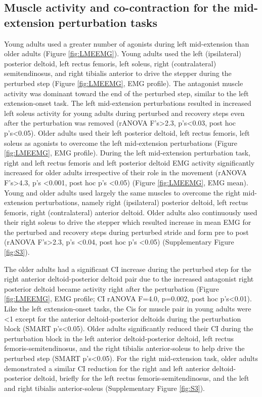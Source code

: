 \documentclass[../thesis_seyed.tex]{subfiles}
\begin{document}
\subsection{Muscle activity and co-contraction for the mid-extension perturbation tasks}
Young adults used a greater number of agonists during left mid-extension than older adults (Figure \ref{fig:LMEEMG}). Young adults used the left (ipsilateral) posterior deltoid, left rectus femoris, left soleus, right (contralateral) semitendinosus, and right tibialis anterior to drive the stepper during the perturbed step (Figure \ref{fig:LMEEMG}, EMG profile). The antagonist muscle activity was dominant toward the end of the perturbed step, similar to the left extension-onset task. The left mid-extension perturbations resulted in increased left soleus activity for young adults during perturbed and recovery steps even after the perturbation was removed (rANOVA F’s>2.3, p’s<0.03, post hoc p’s<0.05). Older adults used their left posterior deltoid, left rectus femoris, left soleus as agonists to overcome the left mid-extension perturbations (Figure \ref{fig:LMEEMG}, EMG profile). During the left mid-extension perturbation task, right and left rectus femoris and left posterior deltoid EMG activity significantly increased for older adults irrespective of their role in the movement (rANOVA F's>4.3, p's <0.001, post hoc p's <0.05) (Figure \ref{fig:LMEEMG}, EMG mean). Young and older adults used largely the same muscles to overcome the right mid-extension perturbations, namely right (ipsilateral) posterior deltoid, left rectus femoris, right (contralateral) anterior deltoid. Older adults also continuously used their right soleus to drive the stepper which resulted increase in mean EMG for the perturbed and recovery steps during perturbed stride and form pre to post (rANOVA F's>2.3, p's <0.04, post hoc p's <0.05) (Supplementary Figure \ref{fig:S3}).

The older adults had a significant CI increase during the perturbed step for the right anterior deltoid-posterior deltoid pair due to the increased antagonist right posterior deltoid became activity right after the perturbation (Figure \ref{fig:LMEEMG}, EMG profile; CI rANOVA F=4.0, p=0.002, post hoc p’s<0.01). Like the left extension-onset tasks, the Cis for muscle pair in young adults were <1 except for the anterior deltoid-posterior deltoids during the perturbation block (SMART p’s<0.05). Older adults significantly reduced their CI during the perturbation block in the left anterior deltoid-posterior deltoid, left rectus femoris-semitendinosus, and the right tibialis anterior-soleus to help drive the perturbed step (SMART p’s<0.05). For the right mid-extension task, older adults demonstrated a similar CI reduction for the right and left anterior deltoid-posterior deltoid, briefly for the left rectus femoris-semitendinosus, and the left and right tibialis anterior-soleus (Supplementary Figure \ref{fig:S3}).
\end{document}
